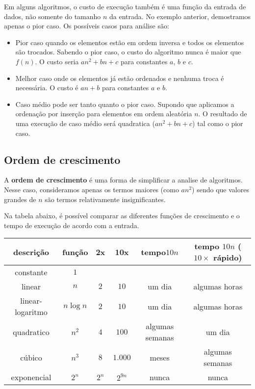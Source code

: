 Em alguns algoritmos, o custo de execução também é uma função da entrada de dados, não somente
do tamanho $n$ da entrada.
No exemplo anterior, demostramos apenas o pior caso. 
Os possíveis casos para análise são:
\begin{itemize}
\item Pior caso quando os elementos estão em ordem inversa e todos os elementos 
são trocados.
Sabendo o pior caso, o custo do algoritmo nunca é maior que $f(n)$.
O custo seria $an^2 + bn +c$ para constantes $a$, $b$ e $c$.

\item Melhor caso onde os elementos já estão ordenados e nenhuma troca é necessária.
O custo é $an + b$ para constantes $a$ e $b$.

\item Caso médio pode ser tanto quanto o pior caso. Supondo que aplicamos 
a ordenação por inserção para elementos em ordem aleatória $n$. 
O resultado de uma execução de caso médio será quadratica ($an^2 + bn +c$)
tal como o pior caso.
\end{itemize}


\subsection{Ordem de crescimento}

A {\bf ordem de crescimento} é uma forma de simplificar a analise de algoritmos.
Nesse caso, consideramos apenas os termos maiores (como $an^2$) sendo que
valores grandes de $n$ são termos relativamente insignificantes.

Na tabela abaixo, é possível comparar as diferentes funções de crescimento e 
o tempo de execução de acordo com a entrada.
\begin{table}[ht]
\centering
\begin{tabular}{cccccc}
\hline
{\bf descrição} & {\bf função} & {\bf 2x} & {\bf 10x} & {\bf tempo$10n$} & {\bf tempo $10n$ ($10\times$ rápido)} \\ 
\hline
constante        & $1$ & & & &  \\
linear           & $n$        & $2$ & $10$ & um dia & algumas horas \\
linear-logaritmo & $n \log n$ & $2$ & $10$ & um dia & algumas horas \\
quadratico       & $n^2$      & $4$  & $100$ & algumas semanas & um dia  \\
cúbico           & $n^3$ & $8$ & $1.000$ & meses & algumas semanas  \\
exponencial      & $2^n$  & $2^n$ & $2^{9n}$ & nunca & nunca  \\
\hline
\end{tabular}
\end{table}

